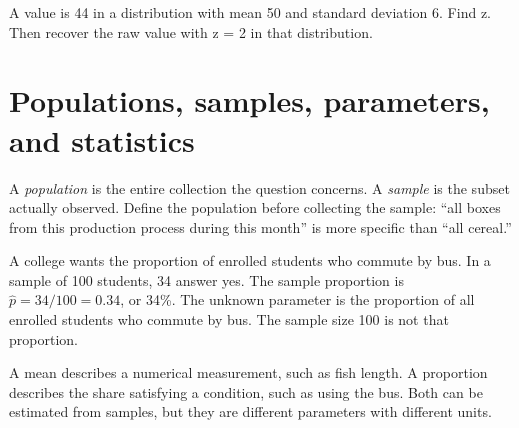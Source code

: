 \documentclass[11pt,letterpaper]{article}
\begin{document}
\begin{tcolorbox}[title={Pause and try 4},breakable]
A value is 44 in a distribution with mean 50 and standard deviation 6. Find z. Then recover the raw value with z = 2 in that distribution.
\end{tcolorbox}

\clearpage

\section{Populations, samples, parameters, and statistics}

A \emph{population} is the entire collection the question concerns. A \emph{sample} is the subset actually observed. Define the population before collecting the sample: ``all boxes from this production process during this month'' is more specific than ``all cereal.''


\par{}\par\medskip

\begin{tcolorbox}[title={A campus survey},breakable]

A college wants the proportion of enrolled students who commute by bus. In a sample of 100 students, 34 answer yes. The sample proportion is \(\widehat p=34/100=0.34\), or 34\%. The unknown parameter is the proportion of all enrolled students who commute by bus. The sample size 100 is not that proportion.


\end{tcolorbox}

A mean describes a numerical measurement, such as fish length. A proportion describes the share satisfying a condition, such as using the bus. Both can be estimated from samples, but they are different parameters with different units.
\end{document}
